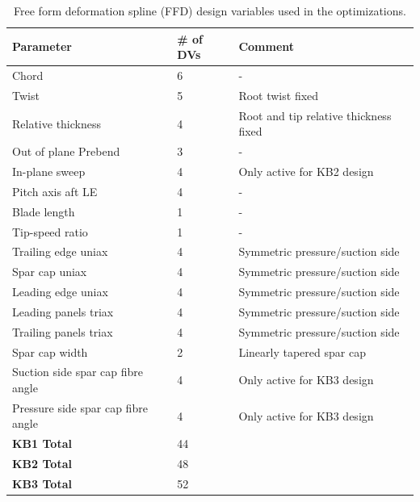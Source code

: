 \begin{table}
\centering
\small
\begin{tabular}{p{5cm}lp{6cm}}
\hline
\textbf{Parameter}		&	\# of DVs			& \textbf{Comment}	\\
\hline
Chord					&	6	&	-	\\
Twist					&	5	&	Root twist fixed	\\
Relative thickness		&	4	& 	Root and tip relative thickness fixed	\\
Out of plane Prebend		&	3	& 	- \\
In-plane sweep			&	4	&	Only active for KB2 design \\
Pitch axis aft LE		&	4	& 	- \\
Blade length				&	1	&	- \\
Tip-speed ratio			&	1	&	- \\
Trailing edge uniax		&	4	&	Symmetric pressure/suction side	\\
Spar cap uniax			&	4	&	Symmetric pressure/suction side	\\
Leading edge uniax		&	4	&	Symmetric pressure/suction side	\\
Leading panels triax		&	4	&	Symmetric pressure/suction side	\\
Trailing panels triax	&	4	&	Symmetric pressure/suction side	\\
Spar cap width			& 	2	&	Linearly tapered spar cap \\
Suction side spar cap fibre angle	&	4	&	Only active for KB3 design	\\
Pressure side spar cap fibre angle	&	4	&	Only active for KB3 design	\\
\hline
\textbf{KB1 Total}		&	44	&	\\
\textbf{KB2 Total}		&	48	&	\\
\textbf{KB3 Total}		&	52	&	\\
\hline
\end{tabular}
\caption{Free form deformation spline (FFD) design variables used in the optimizations.}
\label{tab:dv_summary}
\end{table}

